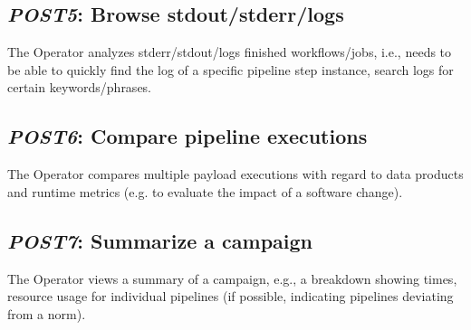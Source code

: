 \documentclass[DM,toc]{lsstdoc}
\newcommand{\usecase}[2]{\subsection{\emph{#1}: #2}\label{use:#1}}
\begin{document}
\usecase{POST5}{Browse stdout/stderr/logs}
The Operator analyzes stderr/stdout/logs finished workflows/jobs,
i.e., needs to be able to quickly find the log of a specific pipeline step
instance, search logs for certain keywords/phrases.

\usecase{POST6}{Compare pipeline executions}
The Operator compares multiple payload executions with regard to data
products and runtime metrics (e.g. to evaluate the impact of a
software change).

\usecase{POST7}{Summarize a campaign}
The Operator views a summary of a campaign, e.g., a breakdown showing
times, resource usage for individual pipelines (if possible, indicating
pipelines deviating from a norm).

%
\end{document}
